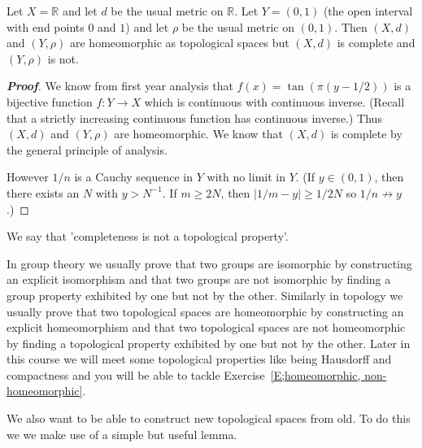 \begin{theorem}\label{T;Cauchy not topological}
Let $X={\mathbb R}$ and let $d$ be the usual metric on ${\mathbb R}$.
Let $Y=(0,1)$ (the open interval with end points $0$ and $1$)
and let $\rho$ be the usual metric on $(0,1)$. Then
$(X,d)$ and $(Y,\rho)$ are homeomorphic as topological spaces
but $(X,d)$ is complete and $(Y,\rho)$ is not.
\end{theorem}
\begin{proof}[\bf Proof] We know from first year analysis that
$f(x)=\tan(\pi(y-1/2))$ is a bijective function $f:Y\rightarrow X$
which is continuous with continuous inverse. (Recall that a strictly increasing
continuous function has continuous inverse.)  Thus
$(X,d)$ and $(Y,\rho)$ are homeomorphic. We know that
$(X,d)$ is complete by the general principle of analysis.

However $1/n$ is a Cauchy sequence in $Y$ with no limit in $Y$. (If $y\in (0,1)$, then there exists an $N$ with $y>N^{-1}$. If $m\geq 2N$, then $|1/m-y|\geq 1/2N$ so $1/n\nrightarrow y$.)
\end{proof}

We say that 'completeness is not a topological property'.

In group theory we usually prove that two groups are isomorphic
by constructing an explicit isomorphism and that two groups
are not isomorphic by finding a group property
exhibited by one but not by the other. Similarly in
topology we usually prove that two topological spaces
are homeomorphic
by constructing an explicit homeomorphism and that two
topological spaces
are not homeomorphic by finding a topological property
exhibited by one but not by the other. Later in this course
we will meet some topological properties like being
Hausdorff and compactness and you will be able to
tackle Exercise~\ref{E;homeomorphic, non-homeomorphic}.

We also want to be able to construct new topological
spaces from old. To do this we we make use of a simple
but useful lemma.

